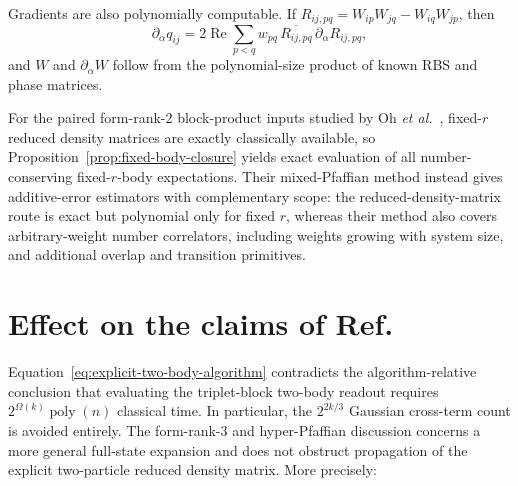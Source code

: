 \documentclass[10pt,twocolumn]{article}
\theoremstyle{plain}
\begin{document}
Gradients are also polynomially computable. If
\(R_{ij,pq}=W_{ip}W_{jq}-W_{iq}W_{jp}\), then
\[
\partial_\alpha q_{ij}
=
2\operatorname{Re}
\sum_{p<q}
w_{pq}\,
\overline{R_{ij,pq}}\,
\partial_\alpha R_{ij,pq},
\]
and \(W\) and \(\partial_\alpha W\) follow from the polynomial-size
product of known RBS and phase matrices.

For the paired form-rank-\(2\) block-product inputs studied by Oh
\emph{et al.}~\cite{Oh2026}, fixed-\(r\) reduced density matrices are
exactly classically available, so
Proposition~\ref{prop:fixed-body-closure} yields exact evaluation of
all number-conserving fixed-\(r\)-body expectations. Their mixed-Pfaffian
method instead gives additive-error estimators with complementary
scope: the reduced-density-matrix route is exact but polynomial only
for fixed \(r\), whereas their method also covers arbitrary-weight
number correlators, including weights growing with system size, and
additional overlap and transition primitives.

\section[Effect on the claims of Ref. 1]
{Effect on the claims of Ref.~\cite{Kerenidis2026v1}}

Equation~\eqref{eq:explicit-two-body-algorithm} contradicts the
algorithm-relative conclusion that evaluating the triplet-block
two-body readout requires
\(2^{\Omega(k)}\operatorname{poly}(n)\) classical time. In particular,
the \(2^{2k/3}\) Gaussian cross-term count is avoided entirely. The
form-rank-\(3\) and hyper-Pfaffian discussion concerns a more general
full-state expansion and does not obstruct propagation of the explicit
two-particle reduced density matrix. More precisely:
\end{document}
